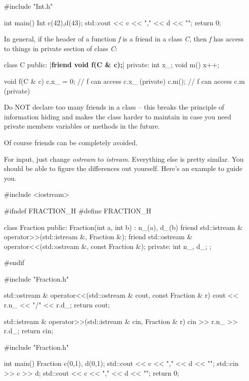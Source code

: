 \begin{consolethree}[escapeinside=||]
#include "Int.h"

int main()
{
    Int c(42),d(43);
    std::cout << c << "," << d << "\n";
    return 0;
}
\end{consolethree}

In general, if the header of a function \textit{f} is a friend in a class
\textit{C}, then \textit{f} has access to things in private section of class
\textit{C}:

\begin{consolethree}[escapeinside=||]
class C
{
public:
    |{\bf friend void f(C \& c);}|
private:
    int x_;
    void m() { x++; }
}

void f(C & c)
{
    c.x_ = 0; // f can access c.x_ (private)
    c.m(); // f can access c.m (private)
}
\end{consolethree}

Do NOT declare too many friends in a class -- this breaks the principle
of information hiding and makes the class harder to maintain in case you
need private members variables or methods in the future.

Of course friends can be completely avoided.


\newpage{}

For input, just change \textit{ostream} to \textit{istream}. Everything else
is pretty similar. You should be able to figure the differences out
yourself. Here's an example to guide you.

\begin{consolethree}[escapeinside=||]
#include <iostream>

#ifndef FRACTION_H
#define FRACTION_H

class Fraction
{
public:
    Fraction(int a, int b)
        : n_(a), d_(b)
    {}
    friend std::istream & operator>>(std::istream &, Fraction &);
    friend std::ostream & operator<<(std::ostream &, const Fraction &);
private:
    int n_, d_;
};

#endif
\end{consolethree}

\begin{consolethree}[escapeinside=||]
#include "Fraction.h"

std::ostream & operator<<(std::ostream & cout, const Fraction & r)
{
    cout << r.n_ << "/" << r.d_;
    return cout;
}

std::istream & operator>>(std::istream & cin, Fraction & r)
{
    cin >> r.n_ >> r.d_;
    return cin;
}
\end{consolethree}

\begin{consolethree}[escapeinside=||]
#include "Fraction.h"

int main()
{
    Fraction c(0,1), d(0,1);
    std::cout << c << "," << d << "\n";
    std::cin >> c >> d;
    std::cout << c << "," << d << "\n";
    return 0;
}
\end{consolethree}


